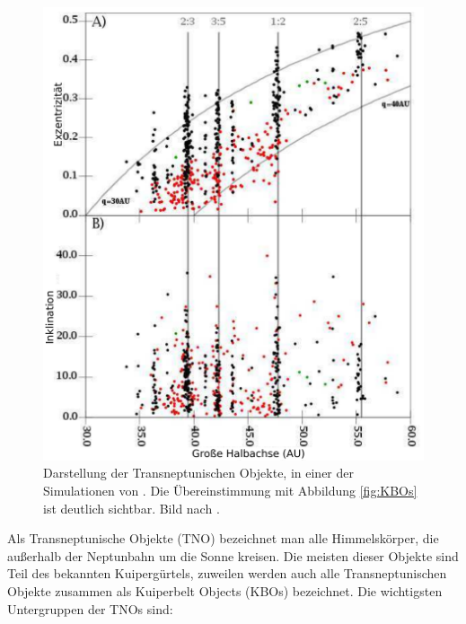\documentclass[12pt,a4paper,twoside,open=right,bibliography=totoc]{scrbook}
\renewcommand{\cite}{ \citep}
\begin{document}
\begin{figure}
\centering 
\includegraphics[scale=0.7]{img/LEVISON2008-6-mod}
\caption{Darstellung der Transneptunischen Objekte, in einer der Simulationen von \cite{Levison2008}. Die Übereinstimmung mit Abbildung \ref{fig:KBOs} ist deutlich sichtbar. Bild nach \cite{Levison2008}.}
\label{fig:KBOs_sim}
\end{figure}
Als Transneptunische Objekte (TNO) bezeichnet man alle Himmelskörper, die außerhalb der Neptunbahn um die Sonne kreisen. Die meisten dieser Objekte sind Teil des bekannten Kuipergürtels, zuweilen werden auch alle Transneptunischen Objekte zusammen als Kuiperbelt Objects (KBOs) bezeichnet.
Die wichtigsten Untergruppen der TNOs sind:
\end{document}
